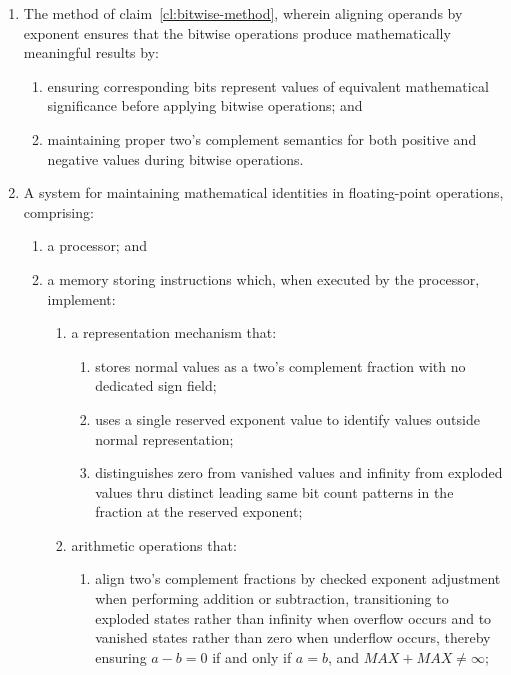 \documentclass[12pt,letter]{article}
\begin{document}
\begin{enumerate}
    \item The method of claim~\ref{cl:bitwise-method}, wherein aligning operands by exponent ensures that the bitwise operations produce mathematically meaningful results by:
          \begin{enumerate}
              \item ensuring corresponding bits represent values of equivalent mathematical significance before applying bitwise operations; and
              \item maintaining proper two's complement semantics for both positive and negative values during bitwise operations.
          \end{enumerate}

    \item A system for maintaining mathematical identities in floating-point operations, comprising:
          \begin{enumerate}
              \item a processor; and
              \item a memory storing instructions which, when executed by the processor, implement:
                    \begin{enumerate}
                        \item a representation mechanism that:
                              \begin{enumerate}
                                  \item stores normal values as a two's complement fraction with no dedicated sign field;
                                  \item uses a single reserved exponent value to identify values outside normal representation;
                                  \item distinguishes zero from vanished values and infinity from exploded values thru distinct leading same bit count patterns in the fraction at the reserved exponent;
                              \end{enumerate}
                        \item arithmetic operations that:
                              \begin{enumerate}
                                  \item align two's complement fractions by checked exponent adjustment when performing addition or subtraction, transitioning to exploded states rather than infinity when overflow occurs and to vanished states rather than zero when underflow occurs, thereby ensuring $a - b = 0$ if and only if $a = b$, and $MAX + MAX \neq \infty$;

\end{enumerate}
\end{enumerate}
\end{enumerate}
\end{enumerate}
\end{document}
